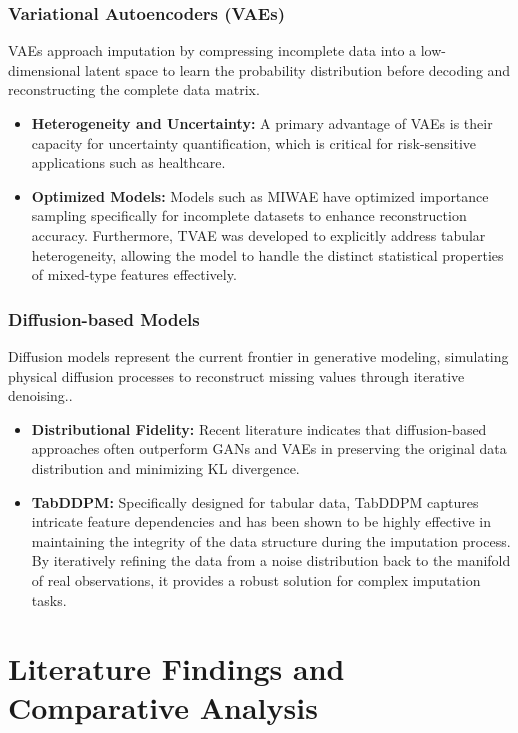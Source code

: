 \documentclass[twocolumn, 9pt]{extarticle}
\begin{document}
\subsubsection{Variational Autoencoders (VAEs)}
VAEs approach imputation by compressing incomplete data into a low-dimensional latent space to learn the probability distribution before decoding and reconstructing the complete data matrix.\cite{Mattei2019}
\begin{itemize}
    \item \textbf{Heterogeneity and Uncertainty:} A primary advantage of VAEs is their capacity for uncertainty quantification, which is critical for risk-sensitive applications such as healthcare.
    \item \textbf{Optimized Models:} Models such as MIWAE have optimized importance sampling specifically for incomplete datasets to enhance reconstruction accuracy. Furthermore, TVAE was developed to explicitly address tabular heterogeneity, allowing the model to handle the distinct statistical properties of mixed-type features effectively.
\end{itemize}

\subsubsection{Diffusion-based Models}
Diffusion models represent the current frontier in generative modeling, simulating physical diffusion processes to reconstruct missing values through iterative denoising.\cite{Kotelnikov2023}.
\begin{itemize}
    \item \textbf{Distributional Fidelity:} Recent literature indicates that diffusion-based approaches often outperform GANs and VAEs in preserving the original data distribution and minimizing KL divergence.
    \item \textbf{TabDDPM:} Specifically designed for tabular data, TabDDPM captures intricate feature dependencies and has been shown to be highly effective in maintaining the integrity of the data structure during the imputation process. By iteratively refining the data from a noise distribution back to the manifold of real observations, it provides a robust solution for complex imputation tasks. 
\end{itemize}



\section{Literature Findings and Comparative Analysis}
\end{document}
